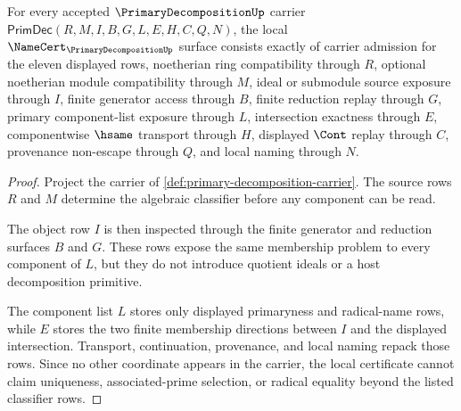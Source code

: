 \begin{theorem}\label{thm:primary-decomposition-obligations}
For every accepted $\PrimaryDecompositionUp$ carrier $\mathsf{PrimDec}(R,M,I,B,G,L,E,H,C,Q,N)$, the local $\NameCert_{\PrimaryDecompositionUp}$ surface consists exactly of carrier admission for the eleven displayed rows, noetherian ring compatibility through $R$, optional noetherian module compatibility through $M$, ideal or submodule source exposure through $I$, finite generator access through $B$, finite reduction replay through $G$, primary component-list exposure through $L$, intersection exactness through $E$, componentwise $\hsame$ transport through $H$, displayed $\Cont$ replay through $C$, provenance non-escape through $Q$, and local naming through $N$.
\end{theorem}
\begin{proof}
Project the carrier of \autoref{def:primary-decomposition-carrier}. The source rows $R$ and $M$ determine the algebraic classifier before any component can be read.

The object row $I$ is then inspected through the finite generator and reduction surfaces $B$ and $G$. These rows expose the same membership problem to every component of $L$, but they do not introduce quotient ideals or a host decomposition primitive.

The component list $L$ stores only displayed primaryness and radical-name rows, while $E$ stores the two finite membership directions between $I$ and the displayed intersection. Transport, continuation, provenance, and local naming repack those rows. Since no other coordinate appears in the carrier, the local certificate cannot claim uniqueness, associated-prime selection, or radical equality beyond the listed classifier rows.
\end{proof}

